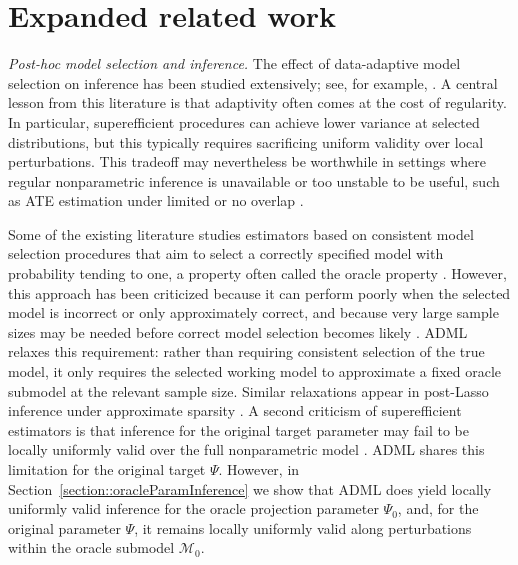 \documentclass[11pt]{article}
\theoremstyle{definition}
\begin{document}
\doublespacing


 
\section{Expanded related work}
 
  \label{section::AMLEGeneral3Lit}

 


\textit{Post-hoc model selection and inference.} The effect of data-adaptive model selection on inference has been studied extensively; see, for example, \cite{bauer1988model, potscher1991effects, buhlmann1999efficient, hjort2003frequentist, bunea2004consistent, LeebModelSelect2005, claeskens2007asymptotic}. A central lesson from this literature is that adaptivity often comes at the cost of regularity. In particular, superefficient procedures can achieve lower variance at selected distributions, but this typically requires sacrificing uniform validity over local perturbations. This tradeoff may nevertheless be worthwhile in settings where regular nonparametric inference is unavailable or too unstable to be useful, such as ATE estimation under limited or no overlap \citep{moosavi2023costs}.

Some of the existing literature studies estimators based on consistent model selection procedures that aim to select a correctly specified model with probability tending to one, a property often called the oracle property \citep{buhlmann1999efficient, oracleSelectSCAD, LeebModelSelect2005, AdaptLassoOracle, AdaptLassoOracleStationary}. However, this approach has been criticized because it can perform poorly when the selected model is incorrect or only approximately correct, and because very large sample sizes may be needed before correct model selection becomes likely \citep{LeebModelSelect2005}. ADML relaxes this requirement: rather than requiring consistent selection of the true model, it only requires the selected working model to approximate a fixed oracle submodel at the relevant sample size. Similar relaxations appear in post-Lasso inference under approximate sparsity \citep{belloni2012sparse, belloni2013honest, belloni2014inference}. A second criticism of superefficient estimators is that inference for the original target parameter may fail to be locally uniformly valid over the full nonparametric model \citep{LeebModelSelect2005, adaptLassoBadPerf, wu2019hodges}. ADML shares this limitation for the original target \(\Psi\). However, in Section~\ref{section::oracleParamInference} we show that ADML does yield locally uniformly valid inference for the oracle projection parameter \(\Psi_0\), and, for the original parameter \(\Psi\), it remains locally uniformly valid along perturbations within the oracle submodel \(\mathcal{M}_0\).
\end{document}
